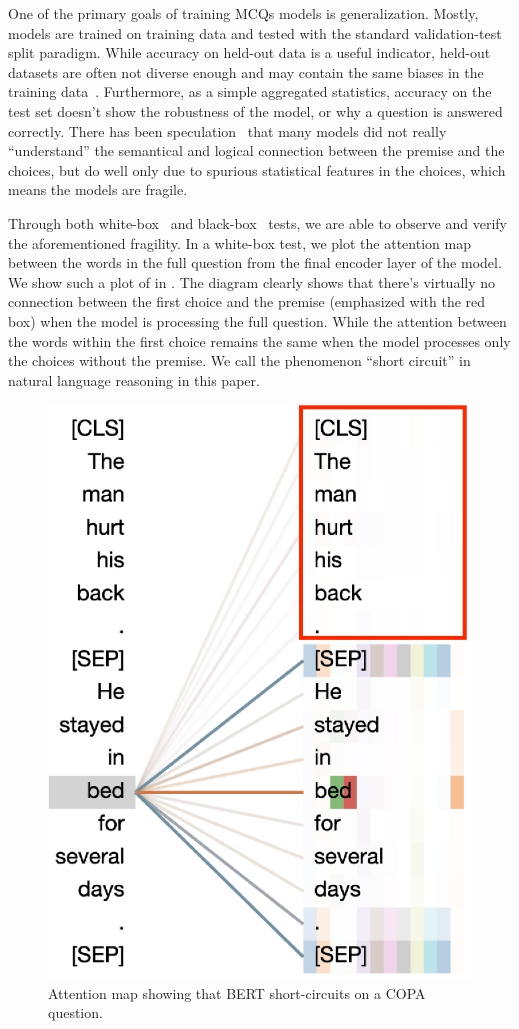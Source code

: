 One of the primary goals of training MCQs models is generalization. 
Mostly, models are trained on training data and tested with the standard 
validation-test split paradigm.  While accuracy on held-out data is a useful
indicator, held-out datasets are often not diverse enough
and may contain the same biases in the training
data~\cite{mccoy2019right}. Furthermore, as a simple aggregated statistics, 
accuracy on the test set doesn't show the robustness of the model,
or why a question is answered correctly. 
 There has been speculation~\cite{endingonly1,zellers2018swag} that many models 
did not really ``understand'' the semantical and logical connection between
the premise and the choices, 
but do well only due to spurious statistical features in the choices, 
which means the models are fragile.

Through both 
white-box~\cite{vig-2019-multiscale} and black-box~\cite{ribeiro-etal-2020-beyond} 
tests, we are able to observe and verify the aforementioned fragility. 
In a white-box test, we plot the attention map between the words in the full question 
from the final encoder layer of the model. We show
such a plot of  in .
The diagram clearly shows that there's virtually no connection
between the first choice and the premise (emphasized with the red box) when the model is processing
the full question. While the attention between the words within the
first choice remains the same when the model processes only the choices
without the premise. 
We call the phenomenon ``short circuit'' in
natural language reasoning in this paper.

\begin{figure}[th!]
\centering
\includegraphics[width=0.5\columnwidth]{figure/end_related.eps}
\caption{Attention map showing that BERT short-circuits on a COPA question.}
\label{fig:att-goodex}
\end{figure}

